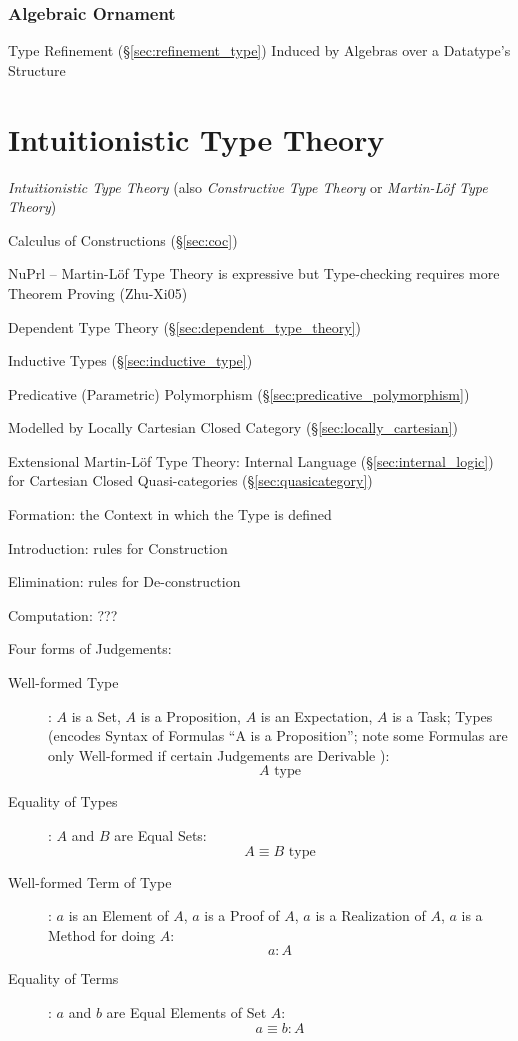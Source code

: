 \subsubsection{Algebraic Ornament}\label{sec:algebraic_ornament}

Type Refinement (\S\ref{sec:refinement_type}) Induced by Algebras over
a Datatype's Structure



\section{Intuitionistic Type Theory}\label{sec:intuitionistic_type}

\cite{martinlof84}

\emph{Intuitionistic Type Theory} (also \emph{Constructive Type
  Theory} or \emph{Martin-L\"of Type Theory})

Calculus of Constructions (\S\ref{sec:coc})

NuPrl -- Martin-L\"of Type Theory is expressive but Type-checking
requires more Theorem Proving (Zhu-Xi05) %

Dependent Type Theory (\S\ref{sec:dependent_type_theory})

Inductive Types (\S\ref{sec:inductive_type})

Predicative (Parametric) Polymorphism
(\S\ref{sec:predicative_polymorphism})

Modelled by Locally Cartesian Closed Category
(\S\ref{sec:locally_cartesian})

Extensional Martin-L\"of Type Theory: Internal Language
(\S\ref{sec:internal_logic}) for Cartesian Closed Quasi-categories
(\S\ref{sec:quasicategory})

Formation: the Context in which the Type is defined

Introduction: rules for Construction

Elimination: rules for De-construction

Computation: ???

Four forms of Judgements:
\begin{description}
  \item [Well-formed Type]: $A$ is a Set, $A$ is a Proposition, $A$ is
    an Expectation, $A$ is a Task; Types (encodes Syntax of Formulas
    ``A is a Proposition''; note some Formulas are only Well-formed if
    certain Judgements are Derivable \cite{thompson99}):
    \[
      A \text{ type}
    \]
  \item [Equality of Types]: $A$ and $B$ are Equal Sets:
    \[
      A \equiv B \text{ type}
    \]
  \item [Well-formed Term of Type]: $a$ is an Element of $A$, $a$ is a
    Proof of $A$, $a$ is a Realization of $A$, $a$ is a Method for
    doing $A$:
    \[
      a : A
    \]
  \item [Equality of Terms]: $a$ and $b$ are Equal Elements of Set $A$:
    \[
      a \equiv b : A
    \]
\end{description}

